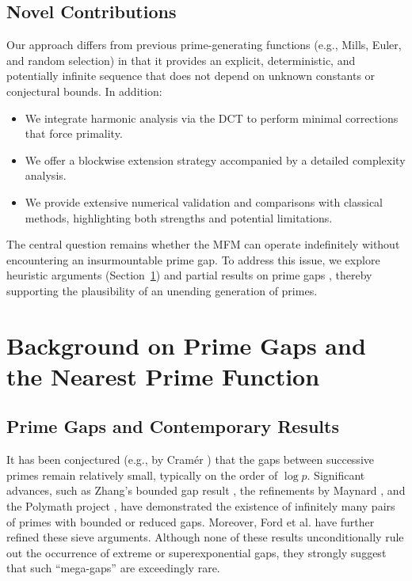 \documentclass[12pt]{article}
\begin{document}
\subsection*{Novel Contributions}
Our approach differs from previous prime-generating functions (e.g., Mills, Euler, and random selection) in that it provides an explicit, deterministic, and potentially infinite sequence that does not depend on unknown constants or conjectural bounds. In addition:
\begin{itemize}
    \item We integrate harmonic analysis via the DCT to perform minimal corrections that force primality.
    \item We offer a blockwise extension strategy accompanied by a detailed complexity analysis.
    \item We provide extensive numerical validation and comparisons with classical methods, highlighting both strengths and potential limitations.
\end{itemize}

The central question remains whether the MFM can operate indefinitely without encountering an insurmountable prime gap. To address this issue, we explore heuristic arguments (Section~\ref{sec:primegaps}) and partial results on prime gaps \cite{BakerHarmanPintz,Maynard,TaoPolymath,Ford2020,Maynard2021,Zhang}, thereby supporting the plausibility of an unending generation of primes.

\section{Background on Prime Gaps and the Nearest Prime Function}\label{sec:primegaps}

\subsection{Prime Gaps and Contemporary Results}
It has been conjectured (e.g., by Cram\'{e}r \cite{Cramer,Granville}) that the gaps between successive primes remain relatively small, typically on the order of $\log p$. Significant advances, such as Zhang's bounded gap result \cite{Zhang}, the refinements by Maynard \cite{Maynard,Maynard2021}, and the Polymath project \cite{TaoPolymath}, have demonstrated the existence of infinitely many pairs of primes with bounded or reduced gaps. Moreover, Ford et al. \cite{Ford2020} have further refined these sieve arguments. Although none of these results unconditionally rule out the occurrence of extreme or superexponential gaps, they strongly suggest that such “mega-gaps” are exceedingly rare.
\end{document}
